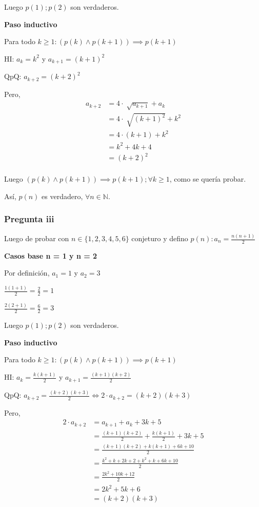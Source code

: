 Luego $ p(1); p(2) $ son verdaderos.

\textbf{Paso inductivo}

Para todo $k \geq 1: (p(k) \wedge p(k+1)) \implies p(k+1)$

HI: $ a_k = k^2 $ y $ a_{k+1} = (k+1)^2 $

QpQ: $ a_{k+2} = (k+2)^2$

Pero,
\begin{align*}
    a_{k+2} &= 4\cdot \sqrt[]{a_{k+1}} + a_k \\
    &= 4\cdot \sqrt[]{(k+1)^2} + k^2 \\
    &= 4\cdot (k+1) + k^2 \\
    &= k^2 + 4k+ 4 \\
    &= (k+2)^2 \\
\end{align*}

Luego $(p(k) \wedge p(k+1)) \implies p(k+1); \forall k \geq 1$, como se quería probar.

Así, $p(n)$ es verdadero, $\forall n \in \mathbb{N}$.

\subsubsection{Pregunta iii}

Luego de probar con $ n \in \{ 1,2,3,4,5,6 \} $ conjeturo y defino $ p(n): a_n = \frac{n(n+1)}{2} $

\textbf{Casos base n = 1 y n = 2}

Por definición, $a_1 = 1$ y $a_2 = 3$

$ \frac{1(1+1)}{2} = \frac{2}{2} = 1$

$ \frac{2(2+1)}{2} = \frac{6}{2} = 3$

Luego $ p(1); p(2) $ son verdaderos.

\textbf{Paso inductivo}

Para todo $k \geq 1: (p(k) \wedge p(k+1)) \implies p(k+1)$

HI: $ a_k = \frac{k(k+1)}{2} $ y $ a_{k+1} = \frac{(k+1)(k+2)}{2} $

QpQ: $ a_{k+2} = \frac{(k+2)(k+3)}{2} \iff 2\cdot a_{k+2} = (k+2)(k+3) $

Pero,
\begin{align*}
    2\cdot a_{k+2} &= a_{k+1} + a_k + 3k + 5 \\
    &= \frac{(k+1)(k+2)}{2} + \frac{k(k+1)}{2} + 3k + 5 \\
    &= \frac{(k+1)(k+2) + k(k+1) + 6k + 10}{2}\\
    &= \frac{k^2 + k + 2k + 2 + k^2 + k + 6k + 10}{2}\\
    &= \frac{2k^2 + 10k + 12}{2}\\
    &= 2k^2 + 5k + 6\\
    &= (k+2)(k+3)\\
\end{align*}

